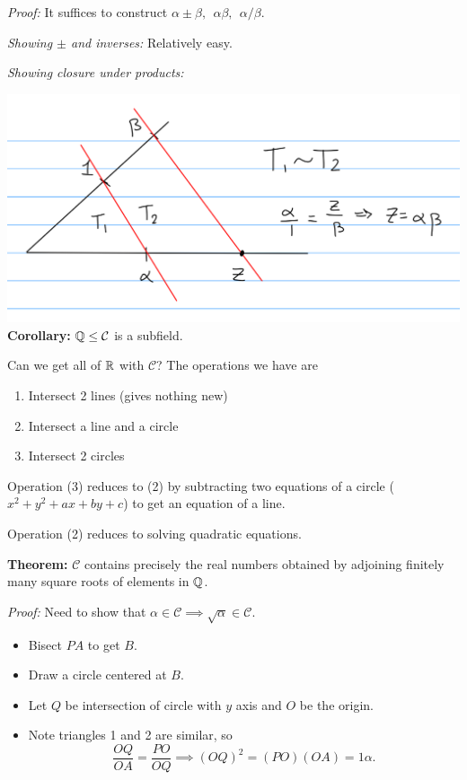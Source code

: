 \emph{Proof:} It suffices to construct
\(\alpha \pm \beta,~~ \alpha\beta,~~ \alpha / \beta\).

\emph{Showing \(\pm\) and inverses:} Relatively easy.

\emph{Showing closure under products:}

\includegraphics{figures/2019-09-17-09:48.png}\\

\textbf{Corollary:} \({\mathbb{Q}} \leq \mathcal C\) is a subfield.

Can we get all of \({\mathbb{R}}\) with \(\mathcal C\)? The operations we have
are

\begin{enumerate}
\def\labelenumi{\arabic{enumi}.}
\item
  Intersect 2 lines (gives nothing new)
\item
  Intersect a line and a circle
\item
  Intersect 2 circles
\end{enumerate}

Operation (3) reduces to (2) by subtracting two equations of a circle
(\(x^2 + y^2 + ax + by + c\)) to get an equation of a line.

Operation (2) reduces to solving quadratic equations.

\textbf{Theorem:} \(\mathcal C\) contains precisely the real numbers
obtained by adjoining finitely many square roots of elements in \({\mathbb{Q}}\).

\emph{Proof:} Need to show that
\(\alpha \in \mathcal C \implies \sqrt \alpha \in \mathcal C\).

\begin{itemize}
\item
  Bisect \(PA\) to get \(B\).
\item
  Draw a circle centered at \(B\).
\item
  Let \(Q\) be intersection of circle with \(y\) axis and \(O\) be the
  origin.
\item
  Note triangles 1 and 2 are similar, so \[
  \frac{OQ}{OA} = \frac{PO}{OQ} \implies (OQ)^2 = (PO)(OA) = 1\alpha
  .\]
\end{itemize}

